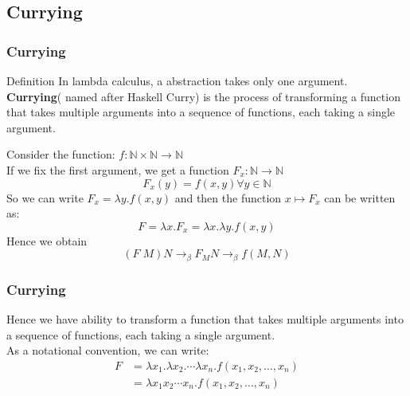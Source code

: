 \documentclass{beamer}
\begin{document}
\subsection{Currying}
\begin{frame}
  \frametitle{Currying}
  \begin{block}{Definition}
    In lambda calculus, a abstraction takes only one argument.\\
    \textbf{Currying}( named after Haskell Curry) is the process of transforming a function that takes multiple arguments into a sequence of functions, each taking a single argument.
  \end{block}
  Consider the function: \(f:\mathbb{N}\times\mathbb{N} \rightarrow \mathbb{N}\) \\
  If we fix the first argument, we get a function \(F_x:\mathbb{N} \rightarrow \mathbb{N}\)\\
  \[
    F_x(y) = f(x,y) \forall y \in \mathbb{N}
  \]  
  So we can write \(F_x = \lambda y.f(x,y)\)
  and then the function \(x \mapsto F_x\) can be written as:
  \[
    F = \lambda x.F_x = \lambda x.\lambda y.f(x,y)
  \]
  Hence we obtain 
  \[
    (F\;M)N \rightarrow_\beta F_M N \rightarrow_\beta f(M,N)
  \]
\end{frame}

\begin{frame}
  \frametitle{Currying}

  Hence we have ability to transform a function that takes multiple arguments into a sequence of functions, each taking a single argument.\\
  As a notational convention, we can write:
  \[
  \begin{aligned}
      F &= \lambda x_1.\lambda x_2.\cdots\lambda x_n.f(x_1,x_2,\ldots,x_n) \\ 
        &= \lambda x_1 x_2 \cdots x_n. f(x_1,x_2,\ldots,x_n)
  \end{aligned}
  \]
\end{frame}
\end{document}
